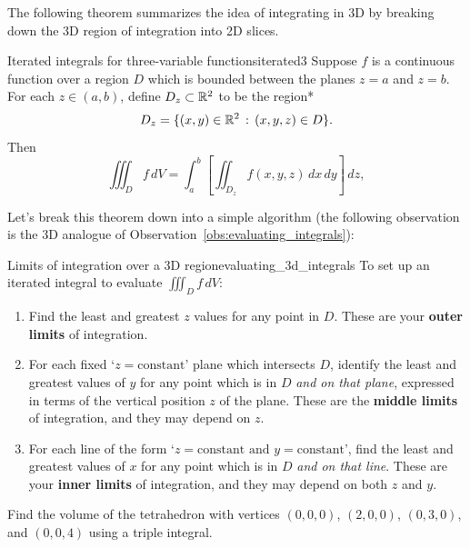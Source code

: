 \documentclass[svgnames]{report}
\begin{document}
The following theorem summarizes the idea of integrating in 3D by
breaking down the 3D region of integration into 2D slices. 

\begin{theo}{Iterated integrals for three-variable functions}{iterated3}
  Suppose $f$ is a continuous function over a region $D$ which is
  bounded between the planes $z = a$ and $z = b$. For each
  $z \in (a,b)$, define $D_z \subset \mathbb{R}^2$ to be the region*
  \[
    D_z = \{(x,y) \in \mathbb{R}^2 \, : \, (x,y,z) \in D\}. 
  \]
  Then
  \[
    \iiint _D f \, dV =
    \int_a^b \left[\iint_{D_z} f(x,y,z) \, dx \, dy \right] \, dz, 
  \]
\end{theo}

Let's break this theorem down into a simple algorithm 
(the following observation is the 3D analogue of
Observation~\ref{obs:evaluating_integrals}): 

\begin{obs}{Limits of integration over a 3D
    region}{evaluating_3d_integrals}
  To set up an iterated integral to evaluate $\iiint_D f \, dV$: 
  \begin{enumerate}[itemsep=3pt, topsep = 8pt]
\item Find the least and greatest $z$ values for any point in
  $D$. These are your \textbf{outer limits} of integration. 
\item For each fixed `$z=\text{constant}$' plane which intersects $D$, identify
  the least and greatest values of $y$ for any point which is in $D$
  \textit{and on that plane}, expressed in terms of the vertical
  position $z$ of the plane. These are the \textbf{middle limits} of
  integration, and they may depend on $z$.
\item For each line of the form `$z=\text{constant and
  }y=\text{constant}$', find the least and greatest values of $x$ for
  any point which is in $D$ \textit{and on that line}. These are your
  \textbf{inner limits} of integration, and they may depend on both
  $z$ and $y$. 
\end{enumerate}
\end{obs}

\begin{example}{}{}
  Find the volume of the tetrahedron with vertices $(0,0,0)$,
  $(2,0,0)$, $(0,3,0)$, and $(0,0,4)$ using a triple integral. 
\end{example}
\end{document}
